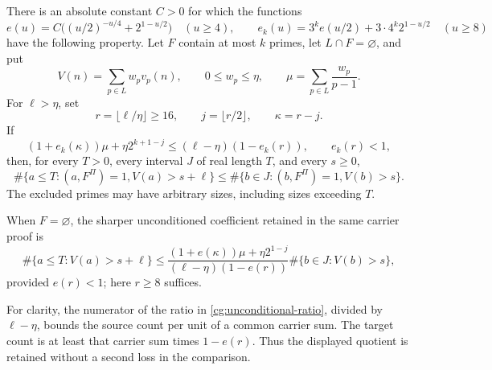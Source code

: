 \begin{proposition}
\label{cg:conditional-input}
There is an absolute constant $C>0$ for which the functions
\[
 e(u)=C\bigl((u/2)^{-u/4}+2^{1-u/2}\bigr)\quad(u\ge4),
 \qquad
 e_k(u)=3^ke(u/2)+3\cdot4^k2^{1-u/2}\quad(u\ge8)
\]
have the following property. Let $F$ contain at most $k$ primes, let
$L\cap F=\varnothing$, and put
\[
 V(n)=\sum_{p\in L}w_pv_p(n),\qquad
 0\le w_p\le\eta,\qquad
 \mu=\sum_{p\in L}\frac{w_p}{p-1}.
\]
For $\ell>\eta$, set
\[
 r=\lfloor\ell/\eta\rfloor\ge16,\qquad
 j=\lfloor r/2\rfloor,\qquad \kappa=r-j.
\]
If
\begin{equation}
 (1+e_k(\kappa))\mu+\eta2^{k+1-j}
 \le(\ell-\eta)(1-e_k(r)),
 \qquad e_k(r)<1,
 \label{cg:conditional-condition}
\end{equation}
then, for every $T>0$, every interval $J$ of real length $T$, and
every $s\ge0$,
\begin{equation}
 \#\{a\le T:(a,F^\Pi)=1, V(a)>s+\ell\}
 \le\#\{b\in J:(b,F^\Pi)=1, V(b)>s\}.
 \label{cg:conditional-level}
\end{equation}
The excluded primes may have arbitrary sizes, including sizes exceeding
$T$.

When $F=\varnothing$, the sharper unconditioned coefficient retained
in the same carrier proof is
\begin{equation}
 \#\{a\le T:V(a)>s+\ell\}
 \le
 \frac{(1+e(\kappa))\mu+\eta2^{1-j}}
      {(\ell-\eta)(1-e(r))}
 \#\{b\in J:V(b)>s\},
 \label{cg:unconditional-ratio}
\end{equation}
provided $e(r)<1$; here $r\ge8$ suffices.
\end{proposition}

For clarity, the numerator of the ratio in
\eqref{cg:unconditional-ratio}, divided by $\ell-\eta$, bounds
the source count per unit of a common carrier sum. The target count is
at least that carrier sum times $1-e(r)$. Thus the displayed quotient
is retained without a second loss in the comparison.

